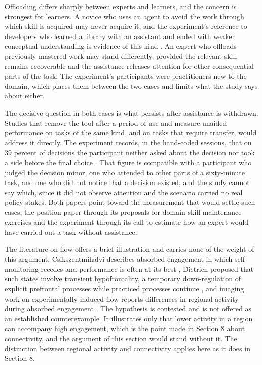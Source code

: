 \documentclass[11pt]{article}
\begin{document}
Offloading differs sharply between experts and learners, and the concern is strongest for learners. A novice who uses an agent to avoid the work through which skill is acquired may never acquire it, and the experiment's reference to developers who learned a library with an assistant and ended with weaker conceptual understanding is evidence of this kind \cite{herdagdelen}. An expert who offloads previously mastered work may stand differently, provided the relevant skill remains recoverable and the assistance releases attention for other consequential parts of the task. The experiment's participants were practitioners new to the domain, which places them between the two cases and limits what the study says about either.

The decisive question in both cases is what persists after assistance is withdrawn. Studies that remove the tool after a period of use and measure unaided performance on tasks of the same kind, and on tasks that require transfer, would address it directly. The experiment records, in the hand-coded sessions, that on 39 percent of decisions the participant neither asked about the decision nor took a side before the final choice \cite{herdagdelen}. That figure is compatible with a participant who judged the decision minor, one who attended to other parts of a sixty-minute task, and one who did not notice that a decision existed, and the study cannot say which, since it did not observe attention and the scenario carried no real policy stakes. Both papers point toward the measurement that would settle such cases, the position paper through its proposals for domain skill maintenance exercises and the experiment through its call to estimate how an expert would have carried out a task without assistance.

The literature on flow offers a brief illustration and carries none of the weight of this argument. Csikszentmihalyi describes absorbed engagement in which self-monitoring recedes and performance is often at its best \cite{csikszentmihalyi}, Dietrich proposed that such states involve transient hypofrontality, a temporary down-regulation of explicit prefrontal processes while practiced processes continue \cite{dietrich2003,dietrich2004}, and imaging work on experimentally induced flow reports differences in regional activity during absorbed engagement \cite{ulrich}. The hypothesis is contested and is not offered as an established counterexample. It illustrates only that lower activity in a region can accompany high engagement, which is the point made in Section 8 about connectivity, and the argument of this section would stand without it. The distinction between regional activity and connectivity applies here as it does in Section 8.
\end{document}
